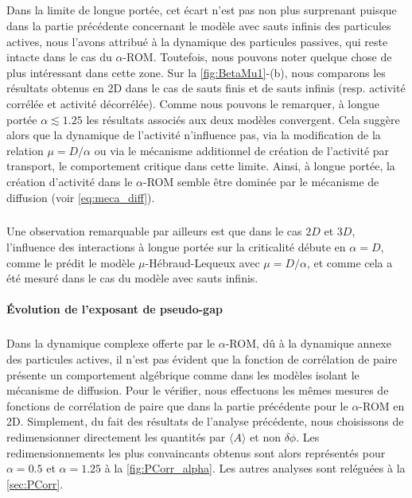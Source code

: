 \subparagraph{}Dans la limite de longue portée, cet écart n'est pas non plus surprenant puisque dans la partie précédente concernant le modèle avec sauts infinis des particules actives, nous l'avons attribué à la dynamique des particules passives, qui reste intacte dans le cas du $\alpha$-ROM. Toutefois, nous pouvons noter quelque chose de plus intéressant dans cette zone. Sur la \autoref{fig:BetaMu1}-(b), nous comparons les résultats obtenus en 2D dans le cas de sauts finis et de sauts infinis (resp. activité corrélée et activité décorrélée). Comme nous pouvons le remarquer, à longue portée $\alpha \lesssim 1.25$ les résultats associés aux deux modèles convergent. Cela suggère alors que la dynamique de l'activité n'influence pas, via la modification de la relation $\mu=D/\alpha$ ou via le mécanisme additionnel de création de l'activité par transport, le comportement critique dans cette limite. Ainsi, à longue portée, la création d'activité dans le $\alpha$-ROM semble être dominée par le mécanisme de diffusion (voir \autoref{eq:meca_diff}).

\subparagraph{}Une observation remarquable par ailleurs est que dans le cas $2D$ et $3D$, l'influence des interactions à longue portée sur la criticalité débute en $\alpha = D$, comme le prédit le modèle $\mu$-Hébraud-Lequeux avec $\mu = D/\alpha$, et comme cela a été mesuré dans le cas du modèle avec sauts infinis. 

\paragraph{Évolution de l'exposant de pseudo-gap}

\subparagraph{}Dans la dynamique complexe offerte par le $\alpha$-ROM, dû à la dynamique annexe des particules actives, il n'est pas évident que la fonction de corrélation de paire présente un comportement algébrique comme dans les modèles isolant le mécanisme de diffusion. Pour le vérifier, nous effectuons les mêmes mesures de fonctions de corrélation de paire que dans la partie précédente pour le $\alpha$-ROM en 2D. Simplement, du fait des résultats de l'analyse précédente, nous choisissons de redimensionner directement les quantités par $\langle A \rangle$ et non $\delta\phi$. Les redimensionnements les plus convaincants obtenus sont alors représentés pour $\alpha=0.5$ et $\alpha=1.25$ à la \autoref{fig:PCorr_alpha}. Les autres analyses sont reléguées à la \autoref{sec:PCorr}. 

